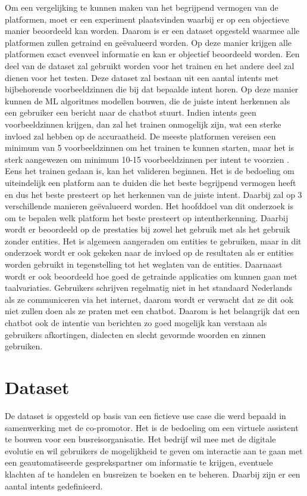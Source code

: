 Om een vergelijking te kunnen maken van het begrijpend vermogen van de platformen, moet er een experiment plaatsvinden waarbij er op een objectieve manier beoordeeld kan worden. Daarom is er een dataset opgesteld waarmee alle platformen zullen getraind en geëvalueerd worden. Op deze manier krijgen alle platformen exact evenveel informatie en kan er objectief beoordeeld worden. Een deel van de dataset zal gebruikt worden voor het trainen en het andere deel zal dienen voor het testen. Deze dataset zal bestaan uit een aantal intents met bijbehorende voorbeeldzinnen die bij dat bepaalde intent horen. Op deze manier kunnen de ML algoritmes modellen bouwen, die de juiste intent herkennen als een gebruiker een bericht naar de chatbot stuurt. Indien intents geen voorbeeldzinnen krijgen, dan zal het trainen onmogelijk zijn, wat een sterke invloed zal hebben op de accuraatheid. De meeste platformen vereisen een minimum van 5 voorbeeldzinnen om het trainen te kunnen starten, maar het is sterk aangewezen om minimum 10-15 voorbeeldzinnen per intent te voorzien \autocite{Greyling2019}. Eens het trainen gedaan is, kan het valideren beginnen. Het is de bedoeling om uiteindelijk een platform aan te duiden die het beste begrijpend vermogen heeft en dus het beste presteert op het herkennen van de juiste intent. Daarbij zal op 3 verschillende manieren geëvalueerd worden. Het hoofddoel van dit onderzoek is om te bepalen welk platform het beste presteert op intentherkenning. Daarbij wordt er beoordeeld op de prestaties bij zowel het gebruik met als het gebruik zonder entities. Het is algemeen aangeraden om entities te gebruiken, maar in dit onderzoek wordt er ook gekeken naar de invloed op de resultaten als er entities worden gebruikt in tegenstelling tot het weglaten van de entities. Daarnaast wordt er ook beoordeeld hoe goed de getrainde applicaties om kunnen gaan met taalvariaties. Gebruikers schrijven regelmatig niet in het standaard Nederlands als ze communiceren via het internet, daarom wordt er verwacht dat ze dit ook niet zullen doen als ze praten met een chatbot. Daarom is het belangrijk dat een chatbot ook de intentie van berichten zo goed mogelijk kan verstaan als gebruikers afkortingen, dialecten en slecht gevormde woorden en zinnen gebruiken.

\section{Dataset}
\label{sec:dataset}

De dataset is opgesteld op basis van een fictieve use case die werd bepaald in samenwerking met de co-promotor. Het is de bedoeling om een virtuele assistent te bouwen voor een busreisorganisatie. Het bedrijf wil mee met de digitale evolutie en wil gebruikers de mogelijkheid te geven om interactie aan te gaan met een geautomatiseerde gesprekspartner om informatie te krijgen, eventuele klachten af te handelen en busreizen te boeken en te beheren. Daarbij zijn er een aantal intents gedefinieerd.

